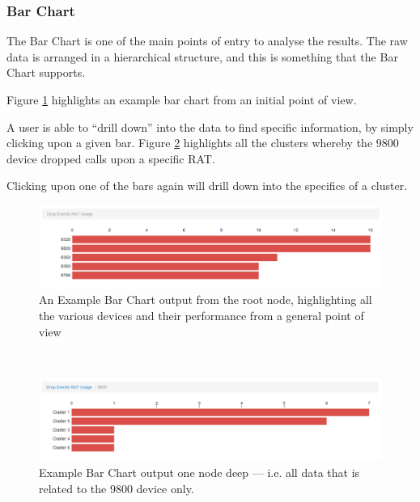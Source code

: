 \subsubsection{Bar Chart}
The Bar Chart is one of the main points of entry to analyse the results. The 
raw data is arranged in a hierarchical structure, and this is something that 
the Bar Chart supports.

Figure \ref{fig:bar_chart_1} highlights an example bar chart from an initial 
point of view.

A user is able to ``drill down'' into the data to find specific information, by
simply clicking upon a given bar. Figure \ref{fig:bar_chart_2} highlights all 
the clusters whereby the 9800 device dropped calls upon a specific RAT. 

Clicking upon one of the bars again will drill down into the specifics of a 
cluster.

\begin{landscape}
  \centering 
    \begin{figure}[H]
      \centering
        \includegraphics[scale=0.75]{chapter8/visualisation/bar_chart_1.png}
        \caption[Example Bar Chart output]
                {An Example Bar Chart output from the root node, highlighting all 
                 the various devices and their performance from a general point of 
                 view}
        \label{fig:bar_chart_1}
    \end{figure}
    ~\\
    \begin{figure}[H]
      \centering
        \includegraphics[scale=0.75]{chapter8/visualisation/bar_chart_2.png}
        \caption[Example Bar Chart output one node deep]
                {Example Bar Chart output one node deep --- i.e. all data that is
                 related to the 9800 device only.}
        \label{fig:bar_chart_2}
    \end{figure}
\end{landscape}


